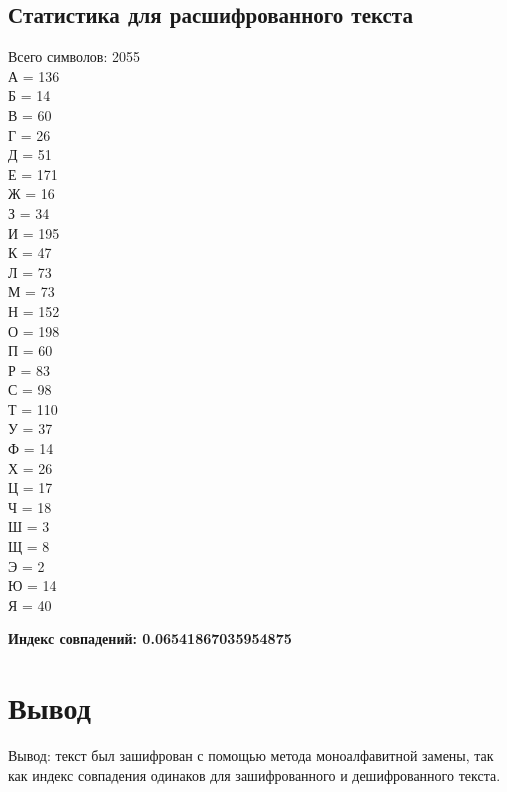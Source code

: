 \documentclass[a4paper, 14pt]{extarticle}
\begin{document}
\subsection{Статистика для расшифрованного текста}

Всего символов: 2055
\\А = 136
\\Б = 14
\\В = 60
\\Г = 26
\\Д = 51
\\Е = 171
\\Ж = 16
\\З = 34
\\И = 195
\\К = 47
\\Л = 73
\\М = 73
\\Н = 152
\\О = 198
\\П = 60
\\Р = 83
\\С = 98
\\Т = 110
\\У = 37
\\Ф = 14
\\Х = 26
\\Ц = 17
\\Ч = 18
\\Ш = 3
\\Щ = 8
\\Э = 2
\\Ю = 14
\\Я = 40

\textbf{Индекс совпадений: 0.06541867035954875}
\section{Вывод}
Вывод:  текст был зашифрован с помощью метода моноалфавитной замены, так как индекс совпадения одинаков для зашифрованного и дешифрованного текста.
\end{document}
